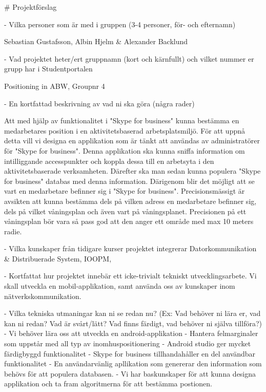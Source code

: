 # Projektförslag

- Vilka personer som är med i gruppen (3-4 personer, för- och efternamn)

  Sebastian Gustafsson, Albin Hjelm & Alexander Backlund

- Vad projektet heter/ert gruppnamn (kort och kärnfullt) och vilket nummer er grupp har i Studentportalen

  Positioning in ABW, Groupnr 4

- En kortfattad beskrivning av vad ni ska göra (några rader)

    Att med hjälp av funktionalitet i "Skype for business" kunna bestämma en medarbetares position i en aktivitetsbaserad arbetsplatsmiljö. För att uppnå detta vill vi designa en applikation som är tänkt att användas av administratörer för "Skype for business". Denna applikation ska kunna sniffa information om intilliggande accesspunkter och koppla dessa till en arbetsyta i den aktivitetsbaserade verksamheten. Därefter ska man sedan kunna populera "Skype for business" databas med denna information. Därigenom blir det möjligt att se vart en medarbetare befinner sig i "Skype for business".
    Precisionsmässigt är avsikten att kunna bestämma dels på vilken adress en medarbetare befinner sig, dels på vilket våningsplan och även vart på våningsplanet.
    Precisionen på ett våningsplan bör vara så pass god att den anger ett område med max 10 meters radie.

- Vilka kunskaper från tidigare kurser projektet integrerar
  Datorkommunikation & Distribuerade System, IOOPM,


- Kortfattat hur projektet innebär ett icke-trivialt tekniskt utvecklingsarbete.
  Vi skall utveckla en mobil-applikation, samt använda oss av kunskaper inom nätverkskommunikation.


- Vilka tekniska utmaningar kan ni se redan nu? (Ex: Vad behöver ni lära er, vad kan ni redan? Vad är svårt/lätt? Vad finns färdigt, vad behöver ni själva tillföra?)
  - Vi behöver lära oss att utveckla en android-applikation
  - Hantera felmarginaler som uppstår med all typ av inomhuspositionering
  - Android studio ger mycket färdigbyggd funktionalitet
  - Skype for business tillhandahåller en del användbar funktionalitet
  - En användarvänlig apllikation som genererar den information som behövs för att populera databasen.
  - Vi har baskunskaper för att kunna designa applikation och ta fram algoritmerna för att bestämma postionen.



